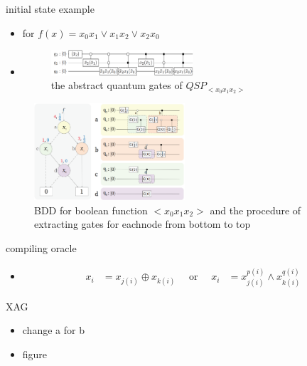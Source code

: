 \documentclass[aspectratio=1610]{beamer}
\begin{document}
\begin{frame}{initial state example}
  \begin{itemize}
    \item for $f(x)=x_0x_1\vee x_1x_2\vee x_2x_0$
    \item 
    \begin{figure}[htbq]
      \centering
      \includegraphics[width=0.5\textwidth]{figure/qsp_example.png}
      \caption{the abstract quantum gates of $QSP_{<x_0x_1x_2>}$} 
      \label{fig-qsp-example}
    \end{figure}
  \end{itemize}
\end{frame}
\begin{frame}
  \begin{figure}[htbq]
    \centering
    \includegraphics[width=0.5\textwidth]{figure/qsp_circuit.png}
    \caption{BDD  for boolean function $<x_0x_1x_2>$ and  the  procedure  of  extracting  gates  for  eachnode from bottom to top} 
    \label{fig-qsp-example-circuit}
  \end{figure}
\end{frame}
\begin{frame}{compiling oracle}
  \begin{itemize}
    \item 
    \begin{align}
      x_{i} & = x_{j(i)} \oplus x_{k(i)} \quad \text { or } \quad x_{i} & = x_{j(i)}^{p(i)} \wedge x_{k(i)}^{q(i)}
    \end{align}
  \end{itemize}
\end{frame}
\begin{frame}{XAG}
  \begin{itemize}
    \item change a for b
    \item figure
  \end{itemize}
\end{frame}
\end{document}
